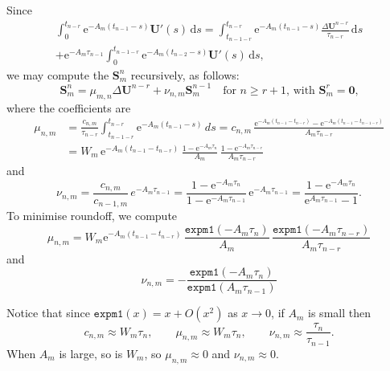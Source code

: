 \documentclass[a4paper,12pt]{article}
\newcommand{\bs}[1]{\boldsymbol{#1}}
\newcommand{\ud}{\mathrm{d}}
\newcommand{\ue}{\mathrm{e}}
\begin{document}
Since
\begin{multline*}
\int_0^{t_{n-r}}\ue^{-A_m(t_{n-1}-s)}\bs{U}'(s)\,\ud s
    =\int_{t_{n-1-r}}^{t_{n-r}}\ue^{-A_m(t_{n-1}-s)}
    \frac{\Delta\bs{U}^{n-r}}{\tau_{n-r}}\,\ud s\\
    +\ue^{-A_m\tau_{n-1}}
    \int_0^{t_{n-1-r}}\ue^{-A_m(t_{n-2}-s)}\bs{U}'(s)\,\ud s,
\end{multline*}
we may compute the $\bs{S}^n_m$ recursively, as follows:
\[
\bs{S}^n_m=\mu_{m,n}\Delta\bs{U}^{n-r}+\nu_{n,m}\bs{S}^{n-1}_m
\quad\text{for $n\ge r+1$, with $\bs{S}^r_m=\bs{0}$,}
\]
where the coefficients are
\begin{align*}
\mu_{n,m}&=\frac{c_{n,m}}{\tau_{n-r}}\int_{t_{n-1-r}}^{t_{n-r}}
    \ue^{-A_m(t_{n-1}-s)}\,ds
=c_{n,m}\,\frac{\ue^{-A_m(t_{n-1}-t_{n-r})}-\ue^{-A_m(t_{n-1}-t_{n-1-r})}}%
{A_m\tau_{n-r}}\\
&=W_m\,\ue^{-A_m(t_{n-1}-t_{n-r})}\,\frac{1-\ue^{-A_m\tau_n}}{A_m}\,
    \frac{1-\ue^{-A_m\tau_{n-r}}}{A_m\tau_{n-r}}
\end{align*}
and
\[
\nu_{n,m}=\frac{c_{n,m}}{c_{n-1,m}}\,e^{-A_m\tau_{n-1}}
    =\frac{1-\ue^{-A_m\tau_n}}{1-\ue^{-A_m\tau_{n-1}}}\,\ue^{-A_m\tau_{n-1}}
    =\frac{1-\ue^{-A_m\tau_n}}{\ue^{A_m\tau_{n-1}}-1}.
\]
To minimise roundoff, we compute
\[
\mu_{n,m}=W_m\ue^{-A_m(t_{n-1}-t_{n-r})}\,
    \frac{\mathtt{expm1}(-A_m\tau_n)}{A_m}\,
    \frac{\mathtt{expm1}(-A_m\tau_{n-r})}{A_m\tau_{n-r}}
\]
and
\[
\nu_{n,m}=-\frac{\mathtt{expm1}(-A_m\tau_n)}{\mathtt{expm1}(A_m\tau_{n-1})}
\]

Notice that since $\mathtt{expm1}(x)=x+O(x^2)$ as $x\to0$, if $A_m$ is small
then
\[
c_{n,m}\approx W_m\tau_n,\qquad
\mu_{n,m}\approx W_m\tau_n,\qquad
\nu_{n,m}\approx\frac{\tau_n}{\tau_{n-1}}.
\]
When $A_m$ is large, so is $W_m$, so $\mu_{n,m}\approx0$ and
$\nu_{n,m}\approx0$.
\end{document}
